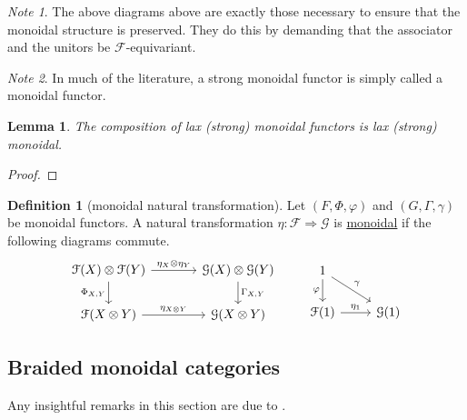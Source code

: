 \documentclass[a4paper,10pt]{scrreprt}
\newcommand{\defn}[1]{\ul{#1}}
\theoremstyle{definition}
\newtheorem{definition}{Definition}[section]
\theoremstyle{plain}
\newtheorem{lemma}{Lemma}[section]
\theoremstyle{remark}
\newtheorem{note}{Note}[section]
\begin{document}
\begin{note}
  The above diagrams above are exactly those necessary to ensure that the monoidal structure is preserved. They do this by demanding that the associator and the unitors be $\mathcal{F}$-equivariant.
\end{note} 

\begin{note}
  In much of the literature, a strong monoidal functor is simply called a monoidal functor.
\end{note}

\begin{lemma}
  The composition of lax (strong) monoidal functors is lax (strong) monoidal.
\end{lemma}
\begin{proof}

\end{proof}

\begin{definition}[monoidal natural transformation]
  \label{def:monoidalnaturatransformation}
  Let $(F, \Phi, \varphi)$ and $(G, \Gamma, \gamma)$ be monoidal functors. A natural transformation $\eta: \mathcal{F} \Rightarrow \mathcal{G}$ is \defn{monoidal} if the following diagrams commute.
  \begin{equation*}
    \begin{tikzcd}[column sep=large]
      \mathcal{F}(X) \otimes \mathcal{F}(Y) 
      \arrow[r, "\eta_{X} \otimes \eta_{Y}"]
      \arrow[d, swap, "{\Phi_{X, Y}}"]
      & \mathcal{G}(X) \otimes \mathcal{G}(Y)
      \arrow[d, "{\Gamma_{X, Y}}"]
      \\
      \mathcal{F}(X \otimes Y)
      \arrow[r, "\eta_{X \otimes Y}"]
      & \mathcal{G}(X \otimes Y)
    \end{tikzcd}
    \qquad
    \begin{tikzcd}
      1
      \arrow[d, swap, "\varphi"]
      \arrow[dr, "\gamma"]
      \\
      \mathcal{F}(1)
      \arrow[r, "\eta_{1}"]
      & \mathcal{G}(1)
    \end{tikzcd}
  \end{equation*}
\end{definition}

\subsection{Braided monoidal categories}
Any insightful remarks in this section are due to \cite{baez-this-weeks-finds-137}.
\end{document}
